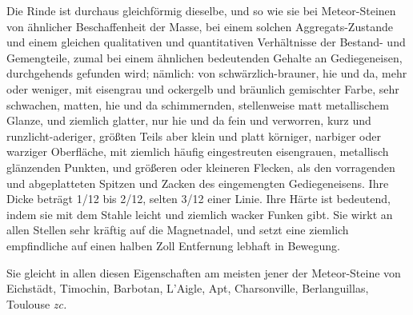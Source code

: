 \documentclass[a4paper, 11pt, oneside, german]{article}
\begin{document}
Die Rinde ist durchaus gleichförmig dieselbe, und so wie sie bei Meteor-Steinen von ähnlicher Beschaffenheit der Masse, bei einem solchen Aggregats-Zustande und einem gleichen qualitativen und quantitativen Verhältnisse der Bestand- und Gemengteile, zumal bei einem ähnlichen bedeutenden Gehalte an Gediegeneisen, durchgehends gefunden wird; nämlich: von schwärzlich-brauner, hie und da, mehr oder weniger, mit eisengrau und ockergelb und bräunlich gemischter Farbe, sehr schwachen, matten, hie und da schimmernden, stellenweise matt metallischem Glanze, und ziemlich glatter, nur hie und da fein und verworren, kurz und runzlicht-aderiger, größten Teils aber klein und platt körniger, narbiger oder warziger Oberfläche, mit ziemlich häufig eingestreuten eisengrauen, metallisch glänzenden Punkten, und größeren oder kleineren Flecken, als den vorragenden und abgeplatteten Spitzen und Zacken des eingemengten Gediegeneisens. Ihre Dicke beträgt 1/12 bis 2/12, selten 3/12 einer Linie. Ihre Härte ist bedeutend, indem sie mit dem Stahle leicht und ziemlich wacker Funken gibt. Sie wirkt an allen Stellen sehr kräftig auf die Magnetnadel, und setzt eine ziemlich empfindliche auf einen halben Zoll Entfernung lebhaft in Bewegung.

Sie gleicht in allen diesen Eigenschaften am meisten jener der Meteor-Steine von Eichstädt, Timochin, Barbotan, L'Aigle, Apt, Charsonville, Berlanguillas, Toulouse \emph{zc.}
\end{document}
